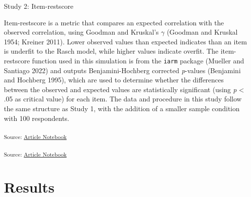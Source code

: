 \documentclass[
  letterpaper,
  DIV=11,
  numbers=noendperiod]{scrartcl}
\begin{document}
Study 2: Item-restscore

Item-restscore is a metric that compares an expected correlation with
the observed correlation, using Goodman and Kruskal's \(\gamma\)
(Goodman and Kruskal 1954; Kreiner 2011). Lower observed values than
expected indicates than an item is underfit to the Rasch model, while
higher values indicate overfit. The item-restscore function used in this
simulation is from the \texttt{iarm} package (Mueller and Santiago 2022)
and outputs Benjamini-Hochberg corrected \emph{p}-values (Benjamini and
Hochberg 1995), which are used to determine whether the differences
between the observed and expected values are statistically significant
(using \emph{p} \textless{} .05 as critical value) for each item. The
data and procedure in this study follow the same structure as Study 1,
with the addition of a smaller sample condition with 100 respondents.

\textsubscript{Source:
\href{https://pgmj.github.io/rasch_itemfit/index.qmd.html}{Article
Notebook}}

\textsubscript{Source:
\href{https://pgmj.github.io/rasch_itemfit/index.qmd.html}{Article
Notebook}}

\section{Results}\label{results-1}
\end{document}
